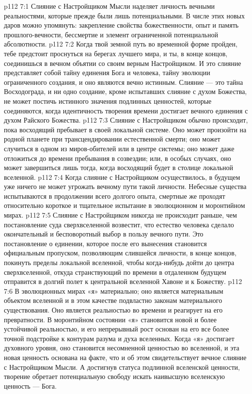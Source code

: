\vs p112 7:1 Слияние с Настройщиком Мысли наделяет личность вечными реальностями, которые прежде были лишь потенциальными. В числе этих новых даров можно упомянуть: закрепление свойства божественности, опыт и память прошлого\hyp{}вечности, бессмертие и элемент ограниченной потенциальной абсолютности.
\vs p112 7:2 \pc Когда твой земной путь во временной форме пройден, тебе предстоит проснуться на берегах лучшего мира, и ты, в конце концов, соединишься в вечном объятии со своим верным Настройщиком. И это слияние представляет собой тайну единения Бога и человека, тайну эволюции ограниченного создания, и оно являются вечно истинным. Слияние --- это тайна Восходограда, и ни одно создание, кроме испытавших слияние с духом Божества, не может постичь истинного значения подлинных ценностей, которые соединяются, когда идентичность творения времени достигает вечного единения с духом Райского Божества.
\vs p112 7:3 Слияние с Настройщиком обычно происходит, пока восходящий пребывает в своей локальной системе. Оно может произойти на родной планете при трансцендировании естественной смерти; оно может случиться в одном из миров\hyp{}обителей или в центре системы; оно может даже отложиться до времени пребывания в созвездии; или, в особых случаях, оно может завершиться лишь тогда, когда восходящий будет в столице локальной вселенной.
\vs p112 7:4 Когда слияние с Настройщиком осуществилось, в будущем уже ничего не может угрожать вечному пути такой личности. Небесные существа испытываются в продолжении всего долгого опыта, смертные же проходят относительно короткое и тщательное испытание в эволюционном и моронтийном мирах.
\vs p112 7:5 Слияние с Настройщиком никогда не происходит раньше, чем постановление суда сверхвселенной возвестит, что естество человека сделало окончательный и бесповоротный выбор в пользу вечного пути. Это постановление о единении, которое после его вынесения становится официальным пропуском, позволяющим слившейся личности, в конце концов, покинуть пределы локальной вселенной, чтобы когда\hyp{}нибудь дойти до центра сверхвселенной, откуда странствующий по времени в отдаленном будущем отправится в долгий полет к центральной вселенной Хавоне и к Божеству.
\vs p112 7:6 \pc В эволюционных мирах «я» материально; оно является материальным объектом вселенной и в этом качестве подвластно законам материального существования. Оно является реальностью во времени и реагирует на его превратности.  В моронтийном состоянии «я» становится новой и более устойчивой реальностью, и его непрерывный рост основан на его все более точной подстройке к контурам разума и духа вселенных.  Когда «я» достигает духовного уровня, оно становится несомненной ценностью во вселенной, и эта новая ценность основана на факте, что  и об этом свидетельствует вечное слияние с Настройщиком Мысли. А достигнув статуса подлинной вселенской ценности, творение обретает потенциальную свободу искать наивысшую вселенскую ценность --- Бога.
